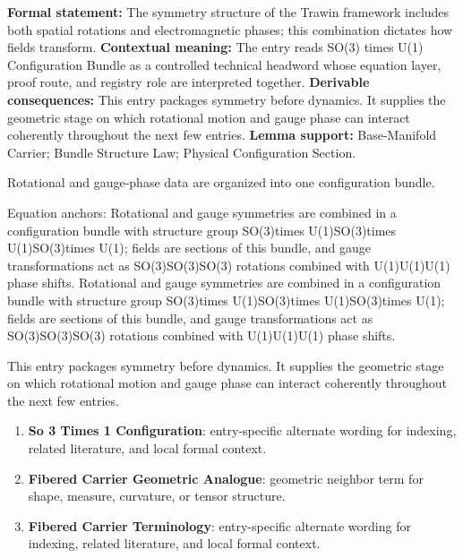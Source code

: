 \begingroup\footnotesize\setlength{\emergencystretch}{3em}\sloppy
\textbf{Formal statement:} The symmetry structure of the Trawin framework includes both spatial rotations and electromagnetic phases; this combination dictates how fields transform. \textbf{Contextual meaning:} The entry reads SO(3) times U(1) Configuration Bundle as a controlled technical headword whose equation layer, proof route, and registry role are interpreted together. \textbf{Derivable consequences:} This entry packages symmetry before dynamics. It supplies the geometric stage on which rotational motion and gauge phase can interact coherently throughout the next few entries. \textbf{Lemma support:} Base-Manifold Carrier; Bundle Structure Law; Physical Configuration Section.\par
\endgroup

Rotational and gauge-phase data are organized into one configuration bundle.

Equation anchors: Rotational and gauge symmetries are combined in a configuration bundle with structure group SO(3)times U(1)SO(3)times U(1)SO(3)times U(1); fields are sections of this bundle, and gauge transformations act as SO(3)SO(3)SO(3) rotations combined with U(1)U(1)U(1) phase shifts. Rotational and gauge symmetries are combined in a configuration bundle with structure group SO(3)times U(1)SO(3)times U(1)SO(3)times U(1); fields are sections of this bundle, and gauge transformations act as SO(3)SO(3)SO(3) rotations combined with U(1)U(1)U(1) phase shifts.

This entry packages symmetry before dynamics. It supplies the geometric stage on which rotational motion and gauge phase can interact coherently throughout the next few entries.
\endgroup

\begingroup\footnotesize\sloppy
\begin{enumerate}[leftmargin=1.35em,itemsep=1pt,topsep=1pt,parsep=0pt]
\item \textbf{So 3 Times 1 Configuration}: entry-specific alternate wording for indexing, related literature, and local formal context.
\item \textbf{Fibered Carrier Geometric Analogue}: geometric neighbor term for shape, measure, curvature, or tensor structure.
\item \textbf{Fibered Carrier Terminology}: entry-specific alternate wording for indexing, related literature, and local formal context.
\end{enumerate}
\endgroup

